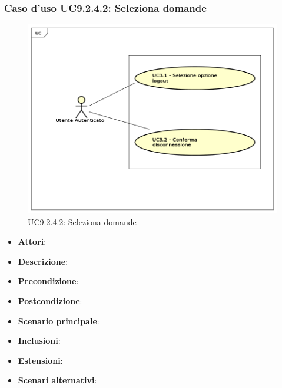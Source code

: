 			\subsubsection{Caso d'uso UC9.2.4.2: Seleziona domande}	
			\label{UC9.2.4.2}
			\begin{figure}[h]
				\centering
			\includegraphics[scale=0.7,keepaspectratio]{UML/UC9.png}
				\caption{UC9.2.4.2: Seleziona domande}
			\end{figure}
			\FloatBarrier
			\begin{itemize}
				\item \textbf{Attori}: 
				\item \textbf{Descrizione}: 
				\item \textbf{Precondizione}: 
				\item \textbf{Postcondizione}: 
				\item \textbf{Scenario principale}:
				\item \textbf{Inclusioni}:
				\item \textbf{Estensioni}:
				\item \textbf{Scenari alternativi}:
			\end{itemize}
			
